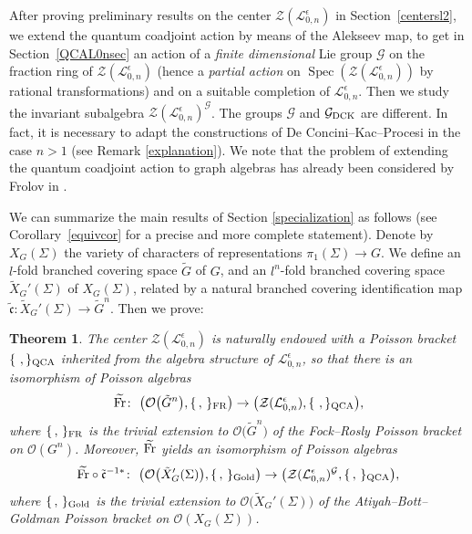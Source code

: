 \documentclass[pdftex]{sigma}%
\numberwithin{equation}{section}
\numberwithin{figure}{section}
\newtheorem{teo}{Theorem}[section]
\newcommand{\e}{\epsilon}
\newcommand{\Gg}{{\mathcal G}}
\newcommand{\Ll}{{\mathcal L}}
\newcommand{\ra}{\rightarrow}
\begin{document}
After proving preliminary results on the center $\mathcal{Z}(\Ll_{0,n}^\e)$ in Section~\ref{centersl2}, we extend the quantum coadjoint action by means of the Alekseev map, to get in Section~\ref{QCAL0nsec} an action of a {\it finite dimensional} Lie group $\Gg$ on the fraction ring of $\mathcal{Z}(\Ll_{0,n}^\e)$ (hence a {\it partial action} on $\operatorname{Spec}(\mathcal{Z}(\Ll_{0,n}^\e))$ by rational transformations) and on a suitable completion of $\Ll_{0,n}^\e$. Then we study the invariant subalgebra $\mathcal{Z}(\Ll_{0,n}^\epsilon)^{\mathcal{G}}$. The groups $\Gg$ and $\Gg_{\rm DCK}$ are different. In fact, it is necessary to adapt the constructions of De Concini--Kac--Procesi in the case $n>1$ (see Remark \ref{explanation}). We note that the problem of extending the quantum coadjoint action to graph algebras has already been considered by Frolov in \cite{Fro}.

We can summarize the main results of Section \ref{specialization} as follows (see Corollary~\ref{equivcor} for a precise and more complete statement). Denote by $X_G(\Sigma)$ the variety of characters of representations $\pi_1(\Sigma)\ra G$. We define an $l$-fold branched covering space $\tilde{G}$ of $G$, and an $l^n$-fold branched covering space $\tilde X_G'(\Sigma)$ of $X_G(\Sigma)$, related by a natural branched covering identification map $\tilde{\mathfrak{c}}\colon \tilde X_G'(\Sigma)\ra \tilde{G}^{n}$. Then we prove:
\begin{teo} \label{teointrocentre} The center $\mathcal{Z}(\Ll_{0,n}^\epsilon)$ is naturally endowed with a Poisson bracket $\{\ ,\}_{\rm QCA}$ inhe\-ri\-ted from the algebra structure of $\Ll_{0,n}^\epsilon$, so that there is an isomorphism of Poisson algebras
\[\widetilde{\rm Fr}\colon \ \big(\mathcal{O}\big(\tilde{G}^{n}\big),\{\, ,\, \}_{\rm FR}\big) \ra \big(\mathcal{Z}(\Ll_{0,n}^\epsilon),\{\ ,\}_{\rm QCA}\big),\]
where $\{\, ,\, \}_{\rm FR}$ is the trivial extension to $\mathcal{O}\big(\tilde{G}^{n}\big)$ of the Fock--Rosly Poisson bracket on $\mathcal{O}(G^n)$. Moreover, $\widetilde{\rm Fr}$ yields an isomorphism of Poisson algebras
\[\widetilde{\rm Fr} \circ \tilde{\mathfrak{c}}^{-1*}\colon \ \big(\mathcal{O}\big(\tilde X_G'(\Sigma)\big),\{\, ,\, \}_{\rm Gold}\big) \ra \big(\mathcal{Z}(\Ll_{0,n}^\epsilon)^{\mathcal{G}},\{\, ,\, \}_{\rm QCA}\big),\]
where $\{\, ,\, \}_{\rm Gold}$ is the trivial extension to $\mathcal{O}\big(\tilde X_G'(\Sigma)\big)$ of the Atiyah--Bott--Goldman Poisson bracket on $\mathcal{O}(X_G(\Sigma))$.
\end{teo}
\end{document}

